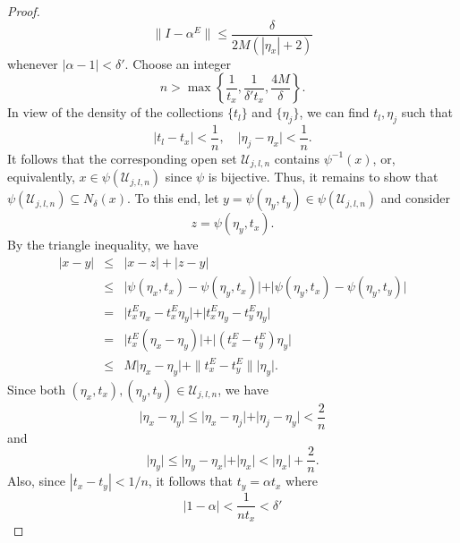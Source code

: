 \documentclass[11pt]{article}
\theoremstyle{theorem}
\begin{document}
\begin{proof}
\begin{equation*}
\|I-\alpha ^E\|\leq \frac{\delta}{2M (  |\eta_x|+2)}
\end{equation*}
whenever $|\alpha-1|<\delta'$. Choose an integer
\begin{equation*}
n>\max \left\{\frac{1}{t_x},\frac{1}{\delta't_x}, \frac{4 M }{\delta}\right\}.
\end{equation*}
In view of the density of the collections $\{t_l\}$ and $\{\eta_j\}$, we can find $t_l, \eta_j$ such that
\begin{equation*}
    \vert t_l - t_x \vert < \frac{1}{n},\quad \vert \eta_j - \eta_x \vert < \frac{1}{n}.
\end{equation*}
It follows that the corresponding open set $\mathcal{U}_{j,l,n}$ contains $\psi^{-1}(x)$, or, equivalently, $x\in \psi(\mathcal{U}_{j,l,n})$ since $\psi$ is bijective. Thus, it remains to show that $\psi(\mathcal{U}_{j,l,n}) \subseteq N_\delta(x)$. To this end, let $y=\psi(\eta_y,t_y)\in\psi(\mathcal{U}_{j,l,n})$ and consider 
\begin{equation*}
    z = \psi(\eta_y,t_x).
\end{equation*}
By the triangle inequality, we have
\begin{eqnarray*}
    | x - y | 
    &\leq& |x-z | + |z-y| \\
    &\leq& \vert \psi(\eta_x,t_x) - \psi(\eta_y,t_x) \vert 
    + \vert \psi(\eta_y,t_x) - \psi(\eta_y,t_y) \vert\\
    &=& \vert t_x^E \eta_x - t_x^E \eta_y \vert 
    + \vert t_x^E \eta_y - t_y^E \eta_y \vert\\
    &=& \vert t_x^E (\eta_x - \eta_y) \vert + \vert (t_x^E - t_y^E) \eta_y \vert\\
    &\leq& M\vert \eta_x - \eta_y \vert + \|{t_x^E - t_y^E}\|  \vert \eta_y \vert.
\end{eqnarray*}
Since both $(\eta_x,t_x),(\eta_y,t_y) \in \mathcal{U}_{j,l,n}$, we have
\begin{equation*}
    \vert \eta_x - \eta_y \vert \leq \vert \eta_x - \eta_j \vert + \vert \eta_j - \eta_y \vert < \frac{2}{n}
\end{equation*}
and
\begin{equation*}
    \vert \eta_y \vert \leq \vert \eta_y - \eta_x \vert + \vert \eta_x \vert < \vert \eta_x \vert + \frac{2}{n}.
\end{equation*}
Also, since $|t_x-t_y|<1/n$, it follows that $t_y=\alpha t_x$ where
\begin{equation*}
|1-\alpha|<\frac{1}{nt_x} < \delta'

\end{equation*}
\end{proof}
\end{document}
